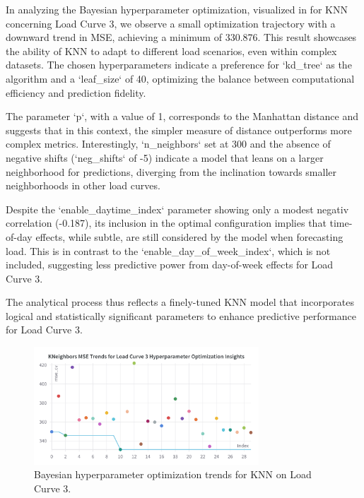 \documentclass{article} %
\begin{document}
In analyzing the Bayesian hyperparameter optimization, visualized in  for \gls*{KNN} concerning Load Curve 3, we observe a small optimization trajectory with a downward trend in \gls*{MSE}, achieving a minimum of 330.876. This result showcases the ability of \gls*{KNN} to adapt to different load scenarios, even within complex datasets. The chosen hyperparameters indicate a preference for `kd\_tree` as the algorithm and a `leaf\_size` of 40, optimizing the balance between computational efficiency and prediction fidelity. 

The parameter `p`, with a value of 1, corresponds to the Manhattan distance and suggests that in this context, the simpler measure of distance outperforms more complex metrics. Interestingly, `n\_neighbors` set at 300 and the absence of negative shifts (`neg\_shifts` of -5) indicate a model that leans on a larger neighborhood for predictions, diverging from the inclination towards smaller neighborhoods in other load curves.

Despite the `enable\_daytime\_index` parameter showing only a modest negativ correlation (-0.187), its inclusion in the optimal configuration implies that time-of-day effects, while subtle, are still considered by the model when forecasting load. This is in contrast to the `enable\_day\_of\_week\_index`, which is not included, suggesting less predictive power from day-of-week effects for Load Curve 3.

The analytical process thus reflects a finely-tuned \gls*{KNN} model that incorporates logical and statistically significant parameters to enhance predictive performance for Load Curve 3.

\begin{figure}[H]
    \centering
    \includegraphics[width=0.75\textwidth]{ressources/Hyperparams/KNN/KNeighbors MSE Trends for Load Curve 3 Hyperparameter Optimization Insights.png}
    \caption{Bayesian hyperparameter optimization trends for KNN on Load Curve 3.}
    \label{fig:knn_lc3}
\end{figure}
\end{document}
